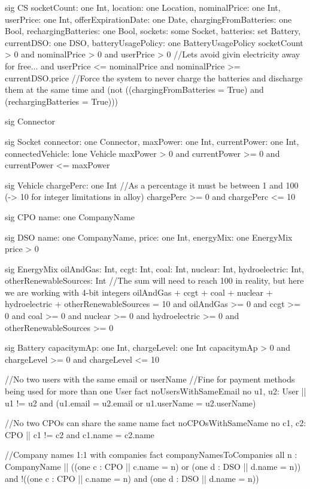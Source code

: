 \documentclass[11pt]{article}
\begin{document}
\begin{ffcode}
sig CS {
	socketCount: one Int,
	location: one Location,
	nominalPrice: one Int,
	userPrice: one Int,
	offerExpirationDate: one Date,
	chargingFromBatteries: one Bool,
	rechargingBatteries: one Bool,
	sockets: some Socket,
	batteries: set Battery,
	currentDSO: one DSO,
	batteryUsagePolicy: one BatteryUsagePolicy
} {
	socketCount > 0
	and nominalPrice > 0
	and userPrice > 0
	//Lets avoid givin electricity away for free...
	and userPrice <= nominalPrice
	and nominalPrice >= currentDSO.price
	//Force the system to never charge the batteries and discharge them at the same time
	and (not ((chargingFromBatteries = True) and (rechargingBatteries = True)))
}

sig Connector {}

sig Socket {
	connector: one Connector,
	maxPower: one Int,
	currentPower: one Int,
	connectedVehicle: lone Vehicle
} {
	maxPower > 0
	and currentPower >= 0
	and currentPower <= maxPower
}

sig Vehicle {
	chargePerc: one Int
} {
	//As a percentage it must be between 1 and 100 (-> 10 for integer limitations in alloy)
	chargePerc >= 0 and chargePerc <= 10
}

sig CPO {
	name: one CompanyName
}

sig DSO {
	name: one CompanyName,
	price: one Int,
	energyMix: one EnergyMix
} {
	price > 0
}

sig EnergyMix {
	oilAndGas: Int,
	ccgt: Int,
	coal: Int,
	nuclear: Int,
	hydroelectric: Int,
	otherRenewableSources: Int
} {
	//The sum will need to reach 100 in reality, but here we are working with 4-bit integers
	oilAndGas + ccgt + coal + nuclear + hydroelectric + otherRenewableSources = 10
	and oilAndGas >= 0
	and ccgt >= 0
	and coal >= 0
	and nuclear >= 0
	and hydroelectric >= 0
	and otherRenewableSources >= 0
}

sig Battery {
	capacitymAp: one Int,
	chargeLevel: one Int
} {
	capacitymAp > 0 and
	chargeLevel >= 0 and chargeLevel <= 10
}

//No two users with the same email or userName
//Fine for payment methods being used for more than one User
fact noUsersWithSameEmail {
	no u1, u2: User |\textbar| u1 != u2 and (u1.email = u2.email or u1.userName = u2.userName)
}

//No two CPOs can share the same name
fact noCPOsWithSameName {
	no c1, c2: CPO |\textbar| c1 != c2 and c1.name = c2.name
}

//Company names 1:1 with companies
fact companyNamesToCompanies {
	all n : CompanyName |\textbar| ((one c : CPO |\textbar| c.name = n) or (one d : DSO |\textbar| d.name = n)) and !((one c : CPO |\textbar| c.name = n) and (one d : DSO |\textbar| d.name = n))
}


\end{ffcode}
\end{document}
